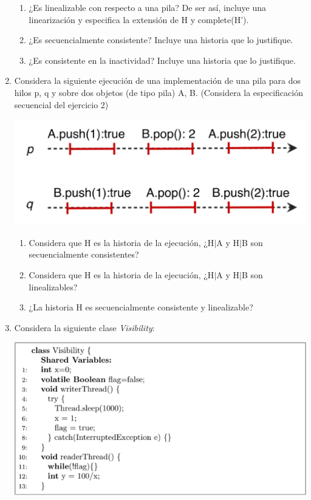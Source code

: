 \begin{enumerate}
    \begin{enumerate}
        \item ¿Es linealizable con respecto a una pila? De ser así, incluye una 
        linearización y especifica la extensión de H y complete(H').

        \item ¿Es secuencialmente consistente? Incluye una historia que lo justifique.

        \item ¿Es consistente en la inactividad? Incluye una historia que lo justifique.
    \end{enumerate}

    \item Considera la siguiente ejecución de una implementación de una pila para dos hilos p, q y sobre dos objetos (de tipo pila) A, B. (Considera la especificación secuencial del ejercicio 2)

    \begin{center}
        \includegraphics[width = 12 cm]{Images/Pregunta4_3.png}
    \end{center}

    \begin{enumerate}
        \item Considera que H es la historia de la ejecución, ¿H$\vert$A y H$\vert$B son secuencialmente consistentes?

        \item Considera que H es la historia de la ejecución, ¿H$\vert$A y H$\vert$B son linealizables?

        \item ¿La historia H es secuencialmente consistente y linealizable?
    \end{enumerate}

    \item Considera la siguiente clase \textit{Visibility}:

    \begin{center}
        \includegraphics[width = 12 cm]{Images/Pregunta5_3.png}
    \end{center}


\end{enumerate}
